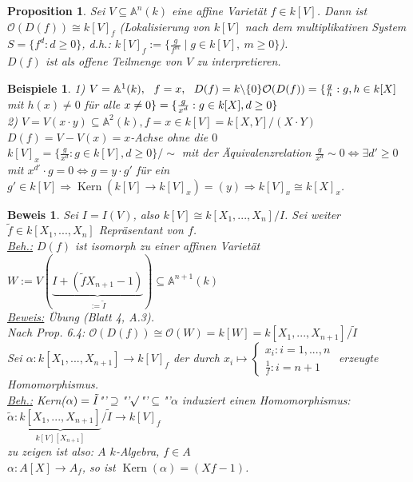 \documentclass[a4paper,12pt]{report}
\theoremstyle{break}
\newtheorem{Prop}[Def]{Proposition}
\newtheorem{Bsp}[Def]{Beispiele}
\theoremstyle{nonumberbreak}
\theoremstyle{nonumberplain}
\newtheorem{Bew}{Beweis}
\DeclareMathOperator{\Kern}{Kern}
\begin{document}
\begin{Prop}
Sei $V\subseteq\mathbb{A}^n(k)$ eine affine Varietät $f\in k[V]$. Dann ist $\mathcal{O}(D(f))\cong k[V]_f$ (Lokalisierung von $k[V]$ nach dem multiplikativen System $S=\{f^d: d\geq 0\}$, d.h.: $k[V]_f:=\{\frac{g}{f^m}\mid g\in k[V], ~ m \geq 0\}$).\\
$D(f)$ ist als offene Teilmenge von $V$ zu interpretieren.
\end{Prop}
\begin{Bsp}
1) $V=\mathbb{A}^1(k),~~f=x,~~ D(f)=k\backslash \{0\}\\
\mathcal{O}(D(f))=\{\frac{g}{h}: g,h\in k[X]$ mit $h(x)\neq 0$ für alle $x\neq 0\}\\
=\{\frac{g}{x^d}: g\in k[X], d\geq 0\}$\\
2) $V=V(x\cdot y)\subseteq \mathbb{A}^2(k), f=x\in k[V]=k[X,Y]/(X\cdot Y)$\\
$D(f)=V-V(x)= x$-Achse ohne die $0$\\
$k[V]_x=\{\frac{g}{x^d}: g\in k[V], d\geq 0\}/\sim$ mit der Äquivalenzrelation $\frac{g}{x^d} \sim 0\Leftrightarrow \exists d'\geq 0$ mit $x^{d'}\cdot g=0\Leftrightarrow g=y\cdot g'$ für ein $g'\in k[V]\Rightarrow \operatorname{Kern}(k[V]\rightarrow k[V]_x)=(y)\Rightarrow k[V]_x\cong k[X]_x$.
\end{Bsp}
\begin{Bew}
Sei $I=I(V)$, also $k[V]\cong k[X_1,...,X_n]/I$. Sei weiter $\tilde{f}\in k[X_1,...,X_n]$ Repräsentant von $f$.\\
\underline{Beh.:} $D(f)$ ist isomorph zu einer affinen Varietät $W:=V(\underbrace{I+(\tilde{f}X_{n+1}-1)}_{:=\tilde{I}})\subseteq \mathbb{A}^{n+1}(k)$\\
\underline{Beweis:} Übung (Blatt 4, A.3).\\
Nach Prop. 6.4: $\mathcal{O}(D(f))\cong\mathcal{O}(W)=k[W]=k[X_1,...,X_{n+1}]/\tilde{I}$\\
Sei $\alpha: k[X_1,...,X_{n+1}] \rightarrow k[V]_f$ der durch $x_i\mapsto\begin{cases}
x_i: i=1,...,n\\
\frac{1}{f}: i=n+1
\end{cases}$ erzeugte Homomorphismus.\\
\underline{Beh.:} Kern($\alpha)=\tilde{I}\\
$"'$\supseteq$"'$ \surd\\
$"'$\subseteq$"'$ \alpha$ induziert einen Homomorphismus: $\tilde{\alpha}:\underbrace{k[X_1,...,X_{n+1}]}_{k[V][X_{n+1}]}/\tilde{I}\rightarrow k[V]_f$\\
zu zeigen ist also: $A$ $k$-Algebra, $f\in A$\\
$\alpha: A[X]\rightarrow A_f$, so ist $\Kern(\alpha)=(Xf-1)$.
\end{Bew}
\end{document}
